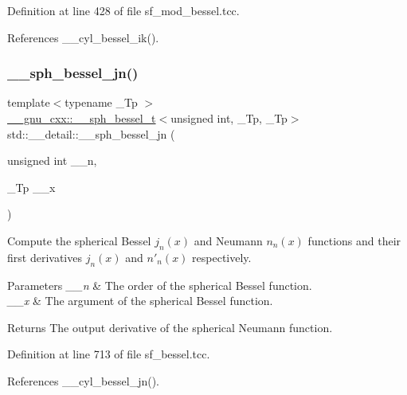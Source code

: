 Definition at line 428 of file sf\+\_\+mod\+\_\+bessel.\+tcc.



References \+\_\+\+\_\+cyl\+\_\+bessel\+\_\+ik().

\mbox{\label{namespacestd_1_1____detail_afd4f4f072924a9396676c437135c27f9}} 
\subsubsection{\texorpdfstring{\+\_\+\+\_\+sph\+\_\+bessel\+\_\+jn()}{\_\_sph\_bessel\_jn()}}
{\footnotesize\ttfamily template$<$typename \+\_\+\+Tp $>$ \\
\hyperlink{struct____gnu__cxx_1_1____sph__bessel__t}{\+\_\+\+\_\+gnu\+\_\+cxx\+::\+\_\+\+\_\+sph\+\_\+bessel\+\_\+t}$<$unsigned int, \+\_\+\+Tp, \+\_\+\+Tp$>$ std\+::\+\_\+\+\_\+detail\+::\+\_\+\+\_\+sph\+\_\+bessel\+\_\+jn (\begin{DoxyParamCaption}\item[{unsigned int}]{\+\_\+\+\_\+n,  }\item[{\+\_\+\+Tp}]{\+\_\+\+\_\+x }\end{DoxyParamCaption})}



Compute the spherical Bessel $ j_n(x) $ and Neumann $ n_n(x) $ functions and their first derivatives $ j_n(x) $ and $ n'_n(x) $ respectively. 


\begin{DoxyParams}{Parameters}
{\em \+\_\+\+\_\+n} & The order of the spherical Bessel function. \\
\hline
{\em \+\_\+\+\_\+x} & The argument of the spherical Bessel function. \\
\hline
\end{DoxyParams}
\begin{DoxyReturn}{Returns}
The output derivative of the spherical Neumann function. 
\end{DoxyReturn}


Definition at line 713 of file sf\+\_\+bessel.\+tcc.



References \+\_\+\+\_\+cyl\+\_\+bessel\+\_\+jn().



